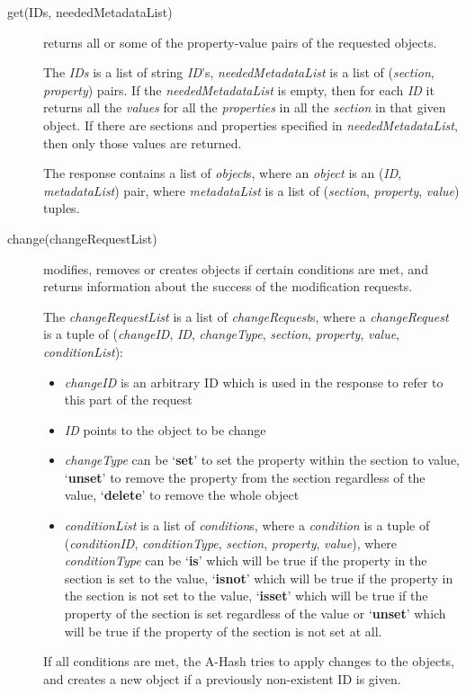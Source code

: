 \documentclass{book}
\begin{document}
\begin{description}
    \item [get(IDs, neededMetadataList)] returns all or some of the property-value pairs of the requested objects.
    
    The \emph{IDs} is a list of string \emph{ID}'s, \emph{neededMetadataList} is a list of (\emph{section}, \emph{property}) pairs. If the \emph{neededMetadataList} is empty, then for each \emph{ID} it returns all the \emph{values} for all the \emph{properties} in all the \emph{section} in that given object. If there are sections and properties specified in \emph{neededMetadataList}, then only those values are returned.

    The response contains a list of \emph{object}s, where an \emph{object} is an (\emph{ID}, \emph{metadataList}) pair, where \emph{metadataList} is a list of (\emph{section}, \emph{property}, \emph{value}) tuples.

    \item [change(changeRequestList)] modifies, removes or creates objects if certain conditions are met, and returns information about the success of the modification requests.
    
    The \emph{changeRequestList} is a list of \emph{changeRequest}s, where a \emph{changeRequest} is a tuple of (\emph{changeID}, \emph{ID}, \emph{changeType}, \emph{section}, \emph{property}, \emph{value}, \emph{conditionList}):
\begin{itemize}
\item \emph{changeID} is an arbitrary ID which is used in the response to refer to this part of the request
\item \emph{ID} points to the object to be change
\item \emph{changeType} can be `\textbf{set}' to set the property within the section to value, `\textbf{unset}' to remove the property from the section regardless of the value, `\textbf{delete}' to remove the whole object
\item \emph{conditionList} is a list of \emph{condition}s, where a \emph{condition} is a tuple of (\emph{conditionID}, \emph{conditionType}, \emph{section}, \emph{property}, \emph{value}), where \emph{conditionType} can be `\textbf{is}' which will be true if the property in the section is set to the value, `\textbf{isnot}' which will be true if the property in the section is not set to the value, `\textbf{isset}' which will be true if the property of the section is set regardless of the value or `\textbf{unset}' which will be true if the property of the section is not set at all.
\end{itemize}
    If all conditions are met, the A-Hash tries to apply changes to the objects, and creates a new object if a previously non-existent ID is given.
    

\end{description}
\end{document}
